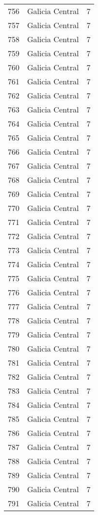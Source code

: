 \begin{table}[p]
\begin{tabular}{rlr}
  756 & Galicia Central &   7 \\ 
  757 & Galicia Central &   7 \\ 
  758 & Galicia Central &   7 \\ 
  759 & Galicia Central &   7 \\ 
  760 & Galicia Central &   7 \\ 
  761 & Galicia Central &   7 \\ 
  762 & Galicia Central &   7 \\ 
  763 & Galicia Central &   7 \\ 
  764 & Galicia Central &   7 \\ 
  765 & Galicia Central &   7 \\ 
  766 & Galicia Central &   7 \\ 
  767 & Galicia Central &   7 \\ 
  768 & Galicia Central &   7 \\ 
  769 & Galicia Central &   7 \\ 
  770 & Galicia Central &   7 \\ 
  771 & Galicia Central &   7 \\ 
  772 & Galicia Central &   7 \\ 
  773 & Galicia Central &   7 \\ 
  774 & Galicia Central &   7 \\ 
  775 & Galicia Central &   7 \\ 
  776 & Galicia Central &   7 \\ 
  777 & Galicia Central &   7 \\ 
  778 & Galicia Central &   7 \\ 
  779 & Galicia Central &   7 \\ 
  780 & Galicia Central &   7 \\ 
  781 & Galicia Central &   7 \\ 
  782 & Galicia Central &   7 \\ 
  783 & Galicia Central &   7 \\ 
  784 & Galicia Central &   7 \\ 
  785 & Galicia Central &   7 \\ 
  786 & Galicia Central &   7 \\ 
  787 & Galicia Central &   7 \\ 
  788 & Galicia Central &   7 \\ 
  789 & Galicia Central &   7 \\ 
  790 & Galicia Central &   7 \\ 
  791 & Galicia Central &   7 \\ 

\end{tabular}
\end{table}

